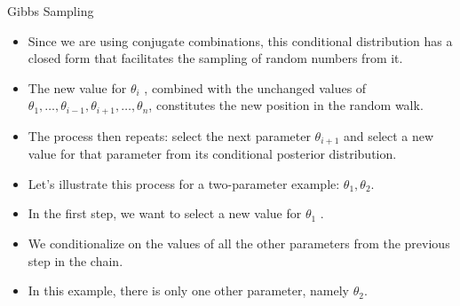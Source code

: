 \documentclass[handout]{beamer}
\begin{document}
\begin{frame}{Gibbs Sampling}
\scriptsize{

\begin{itemize}

\item Since we are using conjugate combinations, this conditional distribution has a closed form that facilitates the sampling of random numbers from it.

\item The new value for $\theta_i$ , combined with the unchanged values of $\theta_1,\dots, \theta_{i-1}, \theta_{i+1}, \dots,\theta_n$, constitutes the new position in the random walk.

\item The process then repeats: select the next parameter $\theta_{i+1}$ and select a new value for that parameter from its conditional posterior distribution.

\item Let's illustrate this process for a two-parameter example: $\theta_1,\theta_2$.

\item In the first step, we want to select a new value for $\theta_1$ . 

\item We conditionalize on the values of all the other
parameters from the previous step in the chain. 

\item In this example, there is only one other parameter, namely $\theta_2$.


\end{itemize}


} 
\end{frame}
\end{document}
